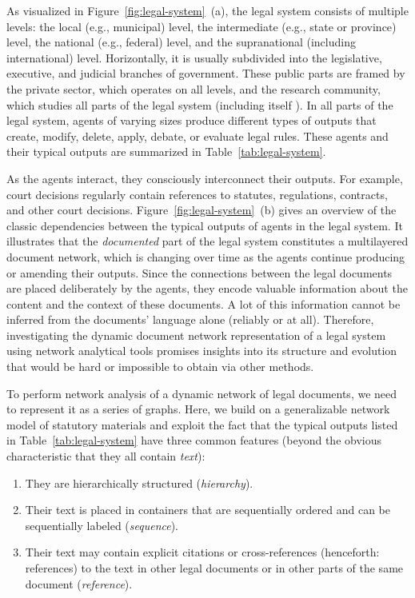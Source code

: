 \documentclass[utf8,sort&compress,table,hidelinks]{frontiersFPHY} %
\begin{document}
As visualized in Figure~\ref{fig:legal-system}~(a), the legal system consists of multiple levels: 
the local (e.g., municipal) level, the intermediate (e.g., state or province) level, the national (e.g., federal) level, and the supranational (including international) level.
Horizontally, it is usually subdivided into the legislative, executive, and judicial branches of government. 
These public parts are framed by the private sector, which operates on all levels, and the research community, which studies all parts of the legal system (including itself \cite{katz2011,newton2011,schwartz2011,george2006,ellickson2000}).
In all parts of the legal system, agents of varying sizes produce different types of outputs that create, modify, delete, apply, debate, or evaluate legal rules.
These agents and their typical outputs are summarized in Table~\ref{tab:legal-system}.



 

As the agents interact, they consciously interconnect their outputs. 
For example, court decisions regularly contain references to statutes, regulations, contracts, and other court decisions.
Figure~\ref{fig:legal-system}~(b) gives an overview of the classic dependencies between the typical outputs of agents in the legal system.
It illustrates that the \emph{documented} part of the legal system constitutes a multilayered document network, 
which is changing over time as the agents continue producing or amending their outputs.
Since the connections between the legal documents are placed deliberately by the agents, they encode valuable information about the content and the context of these documents. 
A lot of this information cannot be inferred from the documents' language alone (reliably or at all).
Therefore, investigating the dynamic document network representation of a legal system using network analytical tools promises insights into its structure and evolution that would be hard or impossible to obtain via other methods. 

To perform network analysis of a dynamic network of legal documents, we need to represent it as a series of graphs. 
Here, we build on a generalizable network model of statutory materials \cite{katz2020} and exploit the fact that the typical outputs listed in Table~\ref{tab:legal-system} have three common features (beyond the obvious characteristic that they all contain \emph{text}):
\begin{enumerate}
    \item They are hierarchically structured (\emph{hierarchy}).
    \item Their text is placed in containers that are sequentially ordered and can be sequentially labeled (\emph{sequence}).
    \item Their text may contain explicit citations or cross-references (henceforth: references) to the text in other legal documents or in other parts of the same document (\emph{reference}).
\end{enumerate}
\end{document}
